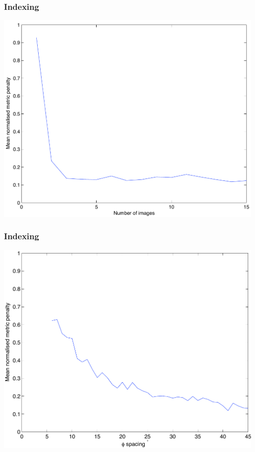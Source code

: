\documentclass[slides,compress]{beamer}
\begin{document}
\begin{frame}
\frametitle{Indexing}
\hspace{3cm}
\includegraphics[scale=0.5]{figures/no_images.pdf}
\end{frame}

\begin{frame}
\frametitle{Indexing}
\hspace{3cm}
\includegraphics[scale=0.5]{figures/phi_spacing_45a.pdf}
\end{frame}
\end{document}
